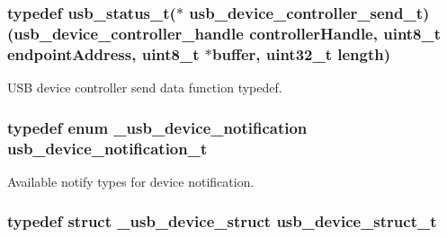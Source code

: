 \hypertarget{group__usb__device__controller__driver_ga5879c987e628c5c5a27b5fcc685e90c8}{
\subsubsection[{usb\-\_\-device\-\_\-controller\-\_\-send\-\_\-t}]{\setlength{\rightskip}{0pt plus 5cm}typedef {\bf usb\-\_\-status\-\_\-t}($\ast$ usb\-\_\-device\-\_\-controller\-\_\-send\-\_\-t)({\bf usb\-\_\-device\-\_\-controller\-\_\-handle} controller\-Handle, uint8\-\_\-t endpoint\-Address, uint8\-\_\-t $\ast$buffer, uint32\-\_\-t length)}}\label{group__usb__device__controller__driver_ga5879c987e628c5c5a27b5fcc685e90c8}


U\-S\-B device controller send data function typedef. 

\hypertarget{group__usb__device__controller__driver_gabb134b8f1a6b63ae3979523ba53480bc}{
\subsubsection[{usb\-\_\-device\-\_\-notification\-\_\-t}]{\setlength{\rightskip}{0pt plus 5cm}typedef enum {\bf \-\_\-usb\-\_\-device\-\_\-notification}  {\bf usb\-\_\-device\-\_\-notification\-\_\-t}}}\label{group__usb__device__controller__driver_gabb134b8f1a6b63ae3979523ba53480bc}


Available notify types for device notification. 

\hypertarget{group__usb__device__controller__driver_ga4be463ccd1fe520b377febafb0a06c2f}{
\subsubsection[{usb\-\_\-device\-\_\-struct\-\_\-t}]{\setlength{\rightskip}{0pt plus 5cm}typedef struct {\bf \-\_\-usb\-\_\-device\-\_\-struct}  {\bf usb\-\_\-device\-\_\-struct\-\_\-t}}}\label{group__usb__device__controller__driver_ga4be463ccd1fe520b377febafb0a06c2f}


